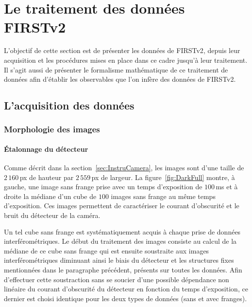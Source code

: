 \chapter{Le traitement des données FIRSTv2}
\label{sec:DataReduction}
\setcounter{figure}{0}
\setcounter{table}{0}
\setcounter{equation}{0}

\minitoc

\clearpage
L'objectif de cette section est de présenter les données de \ac{FIRSTv2}, depuis leur acquisition et les procédures mises en place dans ce cadre jusqu'à leur traitement. Il s'agit aussi de présenter le formalisme mathématique de ce traitement de données afin d'établir les observables que l'on infère des données de \ac{FIRSTv2}.


\section{L'acquisition des données}

\subsection{Morphologie des images}

\subsubsection{Étalonnage du détecteur}
\label{sec:CameraDark}

Comme décrit dans la section~\ref{sec:InstruCamera}, les images sont d'une taille de $2\,160 \,$px de hauteur par $2\,559 \,$px de largeur. La figure~\ref{fig:DarkFull} montre, à gauche, une image sans frange prise avec un temps d'exposition de $100 \,$ms et à droite la médiane d'un cube de $100$ images sans frange au même temps d'exposition. Ces images permettent de caractériser le courant d'obscurité et le bruit du détecteur de la caméra. 

Un tel cube sans frange est systématiquement acquis à chaque prise de données interférométriques. Le début du traitement des images consiste au calcul de la médiane de ce cube sans frange qui est ensuite soustraite aux images interférométriques diminuant ainsi le biais du détecteur et les structures fixes mentionnées dans le paragraphe précédent, présents sur toutes les données. Afin d'effectuer cette soustraction sans se soucier d'une possible dépendance non linéaire du courant d'obscurité du détecteur en fonction du temps d'exposition, ce dernier est choisi identique pour les deux types de données (sans et avec franges).

